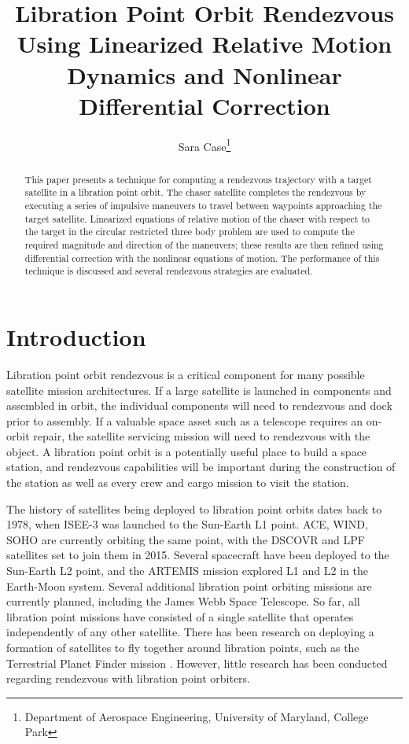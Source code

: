 \documentclass[letterpaper, preprint, paper,11pt]{AAS}	%
\begin{document}
\title{Libration Point Orbit Rendezvous Using Linearized Relative Motion Dynamics and Nonlinear Differential Correction}

\author{Sara Case\thanks{Department of Aerospace Engineering, University of Maryland, College Park}}

\maketitle{} 		

\begin{abstract}
This paper presents a technique for computing a rendezvous trajectory with a target satellite in a libration point orbit.  The chaser satellite completes the rendezvous by executing a series of impulsive maneuvers to travel between waypoints approaching the target satellite.  Linearized equations of relative motion of the chaser with respect to the target in the circular restricted three body problem are used to compute the required magnitude and direction of the maneuvers; these results are then refined using differential correction with the nonlinear equations of motion. The performance of this technique is discussed and several rendezvous strategies are evaluated.
\end{abstract}

\section{Introduction}
Libration point orbit rendezvous is a critical component for many possible satellite mission architectures.  If a large satellite is launched in components and assembled in orbit, the individual components will need to rendezvous and dock prior to assembly.  If a valuable space asset such as a telescope requires an on-orbit repair, the satellite servicing mission will need to rendezvous with the object.  A libration point orbit is a potentially useful place to build a space station, and rendezvous capabilities will be important during the construction of the station as well as every crew and cargo mission to visit the station.

The history of satellites being deployed to libration point orbits dates back to 1978, when ISEE-3 was launched to the Sun-Earth L1 point. ACE, WIND, SOHO are currently orbiting the same point, with the DSCOVR and LPF satellites set to join them in 2015.  Several spacecraft have been deployed to the Sun-Earth L2 point, and the ARTEMIS mission explored L1 and L2 in the Earth-Moon system.  Several additional libration point orbiting missions are currently planned, including the James Webb Space Telescope.  So far, all libration point missions have consisted of a single satellite that operates independently of any other satellite.  There has been research on deploying a formation of satellites to fly together around libration points, such as the Terrestrial Planet Finder mission \cite{beichman2004}.  However, little research has been conducted regarding rendezvous with libration point orbiters. %
\end{document}
